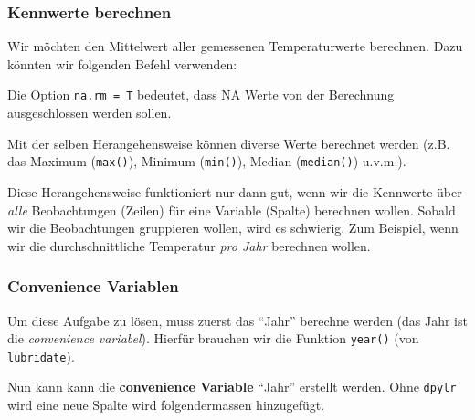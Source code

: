 \documentclass[]{book}
\newenvironment{Shaded}{\begin{snugshade}}{\end{snugshade}}
\newcommand{\CommentTok}[1]{\textcolor[rgb]{0.56,0.35,0.01}{\textit{#1}}}
\newcommand{\DataTypeTok}[1]{\textcolor[rgb]{0.13,0.29,0.53}{#1}}
\newcommand{\KeywordTok}[1]{\textcolor[rgb]{0.13,0.29,0.53}{\textbf{#1}}}
\newcommand{\NormalTok}[1]{#1}
\newcommand{\OperatorTok}[1]{\textcolor[rgb]{0.81,0.36,0.00}{\textbf{#1}}}
\newcommand{\StringTok}[1]{\textcolor[rgb]{0.31,0.60,0.02}{#1}}
\begin{document}
\hypertarget{kennwerte-berechnen}{%
\subsubsection{Kennwerte berechnen}\label{kennwerte-berechnen}}

Wir möchten den Mittelwert aller gemessenen Temperaturwerte berechnen. Dazu könnten wir folgenden Befehl verwenden:

\begin{Shaded}
\end{Shaded}

Die Option \texttt{na.rm\ =\ T} bedeutet, dass NA Werte von der Berechnung ausgeschlossen werden sollen.

Mit der selben Herangehensweise können diverse Werte berechnet werden (z.B. das Maximum (\texttt{max()}), Minimum (\texttt{min()}), Median (\texttt{median()}) u.v.m.).

Diese Herangehensweise funktioniert nur dann gut, wenn wir die Kennwerte über \emph{alle} Beobachtungen (Zeilen) für eine Variable (Spalte) berechnen wollen. Sobald wir die Beobachtungen gruppieren wollen, wird es schwierig. Zum Beispiel, wenn wir die durchschnittliche Temperatur \emph{pro Jahr} berechnen wollen.

\hypertarget{convenience-variablen}{%
\subsubsection{Convenience Variablen}\label{convenience-variablen}}

Um diese Aufgabe zu lösen, muss zuerst das ``Jahr'' berechne werden (das Jahr ist die \emph{convenience variabel}). Hierfür brauchen wir die Funktion \texttt{year()} (von \texttt{lubridate}).

Nun kann kann die \textbf{convenience Variable} ``Jahr'' erstellt werden. Ohne \texttt{dpylr} wird eine neue Spalte wird folgendermassen hinzugefügt.

\begin{Shaded}
\end{Shaded}
\end{document}
